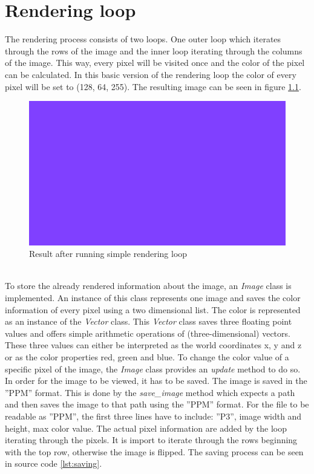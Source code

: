 \documentclass[12pt]{report}
\begin{document}
\chapter{Rendering loop}
\label{chp:step1}
The rendering process consists of two loops. One outer loop which iterates through the rows of the image and the inner loop iterating through the columns of the image. This way, every pixel will be visited once and the color of the pixel can be calculated. In this basic version of the rendering loop the color of every pixel will be set to (128, 64, 255). The resulting image can be seen in figure \ref{fig:step1}.
\begin{figure}[h!]
\includegraphics[width=\textwidth]{step1}
\centering
\caption{Result after running simple rendering loop}
\label{fig:step1}
\end{figure} \\
To store the already rendered information about the image, an \textit{Image} class is implemented. An instance of this class represents one image and saves the color information of every pixel using a two dimensional list. The color is represented as an instance of the \textit{Vector} class. This \textit{Vector} class saves three floating point values and offers simple arithmetic operations of (three-dimensional) vectors. These three values can either be interpreted as the world coordinates x, y and z or as the color properties red, green and blue. To change the color value of a specific pixel of the image, the \textit{Image} class provides an \textit{update} method to do so. In order for the image to be viewed, it has to be saved. The image is saved in the ''PPM'' format. This is done by the \textit{save\_image} method which expects a path and then saves the image to that path using the ''PPM'' format. For the file to be readable as ''PPM'', the first three lines have to include: ''P3'', image width and height, max color value. The actual pixel information are added by the loop iterating through the pixels. It is import to iterate through the rows beginning with the top row, otherwise the image is flipped. The saving process can be seen in source code \ref{lst:saving}.
\end{document}
